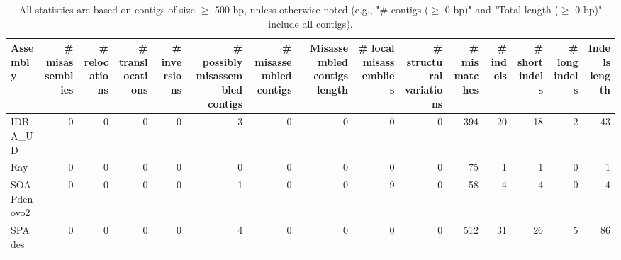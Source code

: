 \documentclass[12pt,a4paper]{article}
\begin{document}
\begin{table}[ht]
\begin{center}
\caption{All statistics are based on contigs of size $\geq$ 500 bp, unless otherwise noted (e.g., "\# contigs ($\geq$ 0 bp)" and "Total length ($\geq$ 0 bp)" include all contigs).}
\begin{tabular}{|l*{14}{|r}|}
\hline
Assembly & \# misassemblies &     \# relocations &     \# translocations &     \# inversions & \# possibly misassembled contigs & \# misassembled contigs & Misassembled contigs length & \# local misassemblies & \# structural variations & \# mismatches & \# indels &     \# short indels &     \# long indels & Indels length \\ \hline
IDBA\_UD & 0 & 0 & 0 & 0 & 3 & 0 & 0 & 0 & 0 & 394 & 20 & 18 & 2 & 43 \\ \hline
Ray & 0 & 0 & 0 & 0 & 0 & 0 & 0 & 0 & 0 & 75 & 1 & 1 & 0 & 1 \\ \hline
SOAPdenovo2 & 0 & 0 & 0 & 0 & 1 & 0 & 0 & 9 & 0 & 58 & 4 & 4 & 0 & 4 \\ \hline
SPAdes & 0 & 0 & 0 & 0 & 4 & 0 & 0 & 0 & 0 & 512 & 31 & 26 & 5 & 86 \\ \hline
\end{tabular}
\end{center}
\end{table}
\end{document}
